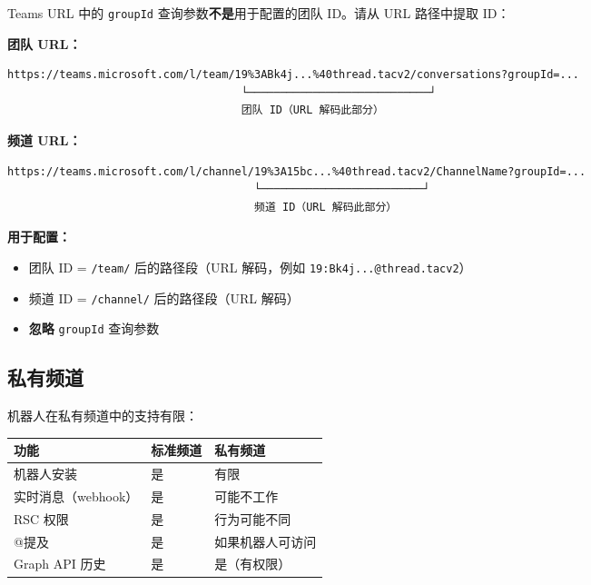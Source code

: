 Teams URL 中的 \texttt{groupId} 查询参数\textbf{不是}用于配置的团队 ID。请从 URL 路径中提取 ID：

\textbf{团队 URL：}

\begin{lstlisting}
https://teams.microsoft.com/l/team/19%3ABk4j...%40thread.tacv2/conversations?groupId=...
                                    └────────────────────────────┘
                                    团队 ID（URL 解码此部分）
\end{lstlisting}


\textbf{频道 URL：}

\begin{lstlisting}
https://teams.microsoft.com/l/channel/19%3A15bc...%40thread.tacv2/ChannelName?groupId=...
                                      └─────────────────────────┘
                                      频道 ID（URL 解码此部分）
\end{lstlisting}


\textbf{用于配置：}

\begin{itemize}
  \item 团队 ID = \texttt{/team/} 后的路径段（URL 解码，例如 \texttt{19:Bk4j...@thread.tacv2}）
  \item 频道 ID = \texttt{/channel/} 后的路径段（URL 解码）
  \item \textbf{忽略} \texttt{groupId} 查询参数
\end{itemize}


\subsection{私有频道}


机器人在私有频道中的支持有限：


\begin{table}[h]
\centering
\small
\begin{tabular}{|l|l|l|}
\hline
功能 & 标准频道 & 私有频道 \\
\hline
机器人安装 & 是 & 有限 \\
\hline
实时消息（webhook） & 是 & 可能不工作 \\
\hline
RSC 权限 & 是 & 行为可能不同 \\
\hline
@提及 & 是 & 如果机器人可访问 \\
\hline
Graph API 历史 & 是 & 是（有权限） \\
\hline
\end{tabular}
\end{table}



